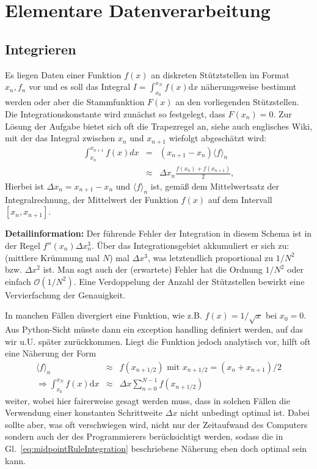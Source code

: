 \chapter{Elementare Datenverarbeitung}

\section{Integrieren}

Es liegen Daten einer Funktion $f(x)$ an diskreten Stütztstellen im Format $x_n, f_n$ vor und es soll das Integral $I=\int_{x_0}^{x_N}f(x)\mathrm{d}x$ näherungsweise bestimmt werden oder aber die Stammfunktion $F(x)$ an den vorliegenden Stützstellen.
%
Die Integrationskonstante wird zunächst so festgelegt, dass $F(x_n) = 0$. 
%
Zur Lösung der Aufgabe bietet sich oft die Trapezregel an, siehe auch englisches Wiki, mit der das Integral zwischen $x_{n}$ und $x_{n+1}$ wiefolgt abgeschätzt wird:
\begin{eqnarray}
\int_{x_n}^{x_{n+1}} f(x) dx & = & (x_{n+1}-x_{n}) \langle f \rangle_n  \nonumber\\
& \approx & \Delta x_n \frac{f(x_{n})+f(x_{n+1})}{2},
\end{eqnarray}
Hierbei ist $\Delta x_n = x_{n+1}-x_n$ und
 $\langle f \rangle_n$ ist, gemäß dem Mittelwertsatz der Integralrechnung, der Mittelwert der Funktion $f(x)$ auf dem Intervall $[x_n,x_{n+1}]$. 
%

\textbf{Detailinformation:} 
Der führende  Fehler der Integration in diesem Schema ist in der Regel $f''(x_n) \Delta x_n^3$.
%
Über das Integrationsgebiet akkumuliert er sich zu: (mittlere Krümmung mal $N$) mal $\Delta x^3$, was letztendlich proportional zu $1/N^2$ bzw. $\Delta x^2$ ist. 
%
Man sagt auch der (erwartete) Fehler hat die Ordnung $1/N^2$ oder einfach $\mathcal{O}(1/N^2)$. 
%
Eine Verdoppelung der Anzahl der Stützstellen bewirkt eine Vervierfachung der Genauigkeit. 


In manchen Fällen divergiert eine Funktion, wie z.B. $f(x)=1/\sqrt{x}$ bei $x_0 = 0$. 
%
Aus Python-Sicht müsste dann ein exception handling definiert werden, auf das wir u.U. später zurückkommen.
%
Liegt die Funktion jedoch analytisch vor, hilft oft eine Näherung der Form
\begin{eqnarray}
\langle f \rangle_n & \approx & f(x_{n+1/2}) \textrm{ mit } x_{n+1/2} = (x_n+x_{n+1})/2\\
\Rightarrow \int_{x_0}^{x_N} f(x) \mathrm{d}x & \approx & \Delta x \sum_{n=0}^{N-1} f(x_{n+1/2})
\label{eq:midpointRuleIntegration} %
\end{eqnarray}
weiter, wobei hier fairerweise gesagt werden muss, dass in solchen Fällen die Verwendung einer konstanten Schrittweite $\Delta x$ nicht unbedingt optimal ist.
%
Dabei sollte aber, was oft  verschwiegen wird, nicht nur der Zeitaufwand des Computers sondern auch der des Programmierers berücksichtigt werden, sodass die in Gl.~\eqref{eq:midpointRuleIntegration} beschriebene Näherung eben doch optimal sein kann. 

